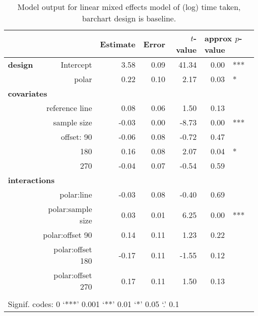 \begin{table}[ht]
\begin{center}
\resizebox{\linewidth}{!} {
\begin{tabular}{lrrrrrl}
  \hline
& & Estimate & Error & $t$-value & \multicolumn{2}{l}{approx $p$-value} \\ 
  \hline
\bf design & Intercept & 3.58 & 0.09 & 41.34 & 0.00 & ***\\ 
&  polar & 0.22 & 0.10 & 2.17 & 0.03 & * \\ [2pt]
\multicolumn{2}{l}{\bf covariates}\\
&reference line & 0.08 & 0.06 & 1.50 & 0.13 \\ [1pt]
 & sample size & -0.03 & 0.00 & -8.73 & 0.00 & ***\\ [1pt]
&  offset: 90 & -0.06 & 0.08 & -0.72 & 0.47 \\ 
& 180 & 0.16 & 0.08 & 2.07 & 0.04 & *\\ 
&  270 & -0.04 & 0.07 & -0.54 & 0.59 \\ [2pt]
\multicolumn{2}{l}{\bf interactions}\\
&  polar:line & -0.03 & 0.08 & -0.40 & 0.69 \\ [1pt]
&    polar:sample size & 0.03 & 0.01 & 6.25 & 0.00 & ***\\ [1pt]
&    polar:offset 90 & 0.14 & 0.11 & 1.23 & 0.22 \\ 
&    polar:offset 180 & -0.17 & 0.11 & -1.55 & 0.12 \\ 
&    polar:offset 270 & 0.17 & 0.11 & 1.50 & 0.13 \\ 
   \hline
\\[-5pt]
   \multicolumn{5}{l}{Signif. codes:  0 `***' 0.001 `**' 0.01 `*' 0.05 `.' 0.1}
\end{tabular}}
\end{center}
\caption{\label{tbl:time} Model output for linear mixed effects model of (log) time taken, barchart design is baseline. }
\end{table}



